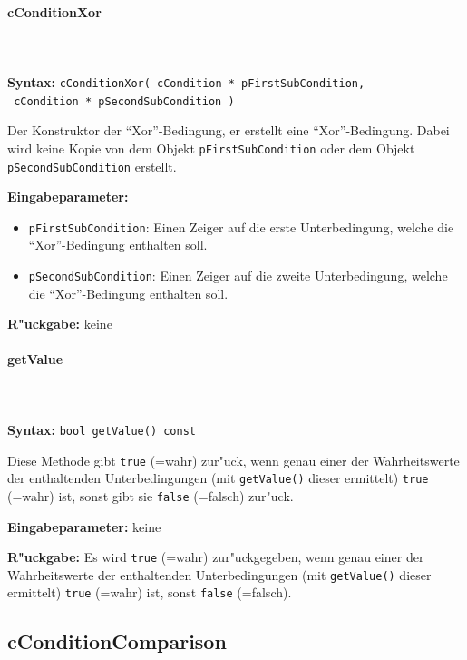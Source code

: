 \paragraph{cConditionXor}

\ \\\\\noindent
\textbf{Syntax:} \verb|cConditionXor( cCondition * pFirstSubCondition,| \\\verb| cCondition * pSecondSubCondition )|

\bigskip\noindent
Der Konstruktor der ``Xor''-Bedingung, er erstellt eine ``Xor''-Bedingung. Dabei wird keine Kopie von dem Objekt \verb|pFirstSubCondition| oder dem Objekt \verb|pSecondSubCondition| erstellt.

\bigskip\noindent
\textbf{Eingabeparameter:}
\begin{itemize}
 \item \verb|pFirstSubCondition|: Einen Zeiger auf die erste Unterbedingung, welche die ``Xor''-Bedingung enthalten soll.
 \item \verb|pSecondSubCondition|: Einen Zeiger auf die zweite Unterbedingung, welche die ``Xor''-Bedingung enthalten soll.
\end{itemize}

\bigskip\noindent
\textbf{R"uckgabe:} keine


\paragraph{getValue}

\ \\\\\noindent
\textbf{Syntax:} \verb|bool getValue() const|

\bigskip\noindent
Diese Methode gibt \verb|true| (=wahr) zur"uck, wenn genau einer der Wahrheitswerte der enthaltenden Unterbedingungen (mit \verb|getValue()| dieser ermittelt) \verb|true| (=wahr) ist, sonst gibt sie \verb|false| (=falsch) zur"uck.

\bigskip\noindent
\textbf{Eingabeparameter:} keine

\bigskip\noindent
\textbf{R"uckgabe:} Es wird \verb|true| (=wahr) zur"uckgegeben, wenn genau einer der Wahrheitswerte der enthaltenden Unterbedingungen (mit \verb|getValue()| dieser ermittelt) \verb|true| (=wahr) ist, sonst \verb|false| (=falsch).



\subsection{cConditionComparison}


